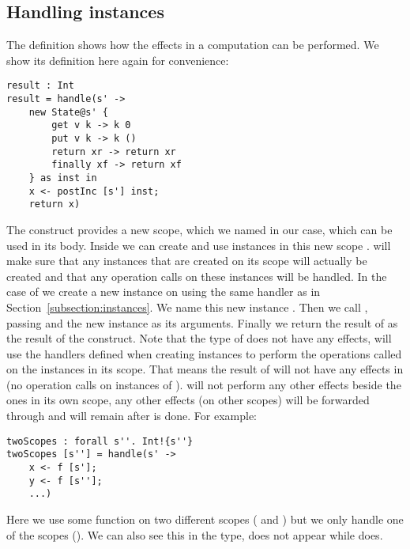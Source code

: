 \subsection{Handling instances}
The definition  shows how the effects in a computation can be performed.
We show its definition here again for convenience:

\begin{verbatim}
result : Int
result = handle(s' ->
	new State@s' {
		get v k -> k 0
		put v k -> k ()
		return xr -> return xr
		finally xf -> return xf
	} as inst in
	x <- postInc [s'] inst;
	return x)
\end{verbatim}

The  construct provides a new scope, which we named  in our case, which can be used in its body.
Inside  we can create and use instances in this new scope .
 will make sure that any instances that are created on its scope will actually be created and that any operation calls on these instances will be handled.
In the case of  we create a new  instance on  using the same handler as in Section~\ref{subsection:instances}.
We name this new instance .
Then we call , passing  and the new instance as its arguments.
Finally we return the result of  as the result of the  construct.
Note that the type of  does not have any effects,  will use the handlers defined when creating instances to perform the operations called on the instances in its scope.
That means the result of  will not have any effects in  (no operation calls on instances of ).
 will not perform any other effects beside the ones in its own scope, any other effects (on other scopes) will be forwarded through and will remain after  is done.
For example:

\begin{verbatim}
twoScopes : forall s''. Int!{s''}
twoScopes [s''] = handle(s' ->
	x <- f [s'];
	y <- f [s''];
	...)
\end{verbatim}

Here we use some function  on two different scopes ( and ) but we only handle one of the scopes ().
We can also see this in the type,  does not appear while  does. 

\newpage
